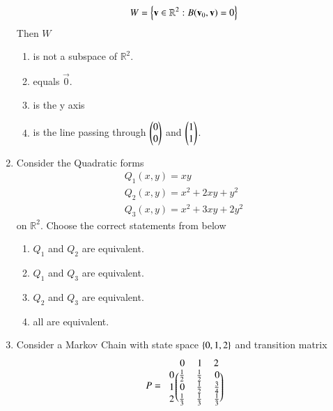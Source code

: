\begin{enumerate}[label=\thesection.\arabic*.,ref=\thesection.\theenumi]
\begin{align}
W = \left\{\mathbf{v} \in \mathbb{R}^2: B(\mathbf{v}_0,\mathbf{v}) =0\right\}
\end{align}
Then $W$
\begin{enumerate}
\item is not a subspace of $\mathbb{R}^2$.
\item equals $\vec{0}$.
\item is the y axis
\item is the line passing through $\begin{pmatrix}0 \\ 0\end{pmatrix}$ and $\begin{pmatrix}1 \\ 1\end{pmatrix}$.
\end{enumerate}
%
\solution

\item Consider the Quadratic forms
\begin{align}
Q_1(x,y) = xy
\\
Q_2(x,y) = x^2+2xy+y^2
\\
Q_3(x,y) = x^2+3xy+2y^2
\end{align}
%
on $\mathbb{R}^2$.  Choose the correct statements from below
\begin{enumerate}
\item $Q_1$ and $Q_2$ are equivalent.
\item $Q_1$ and $Q_3$ are equivalent.
\item $Q_2$ and $Q_3$ are equivalent.
\item all are equivalent.
\end{enumerate}
\solution

\item Consider a Markov Chain with state space $\left\{0,1,2\right\}$ and transition matrix
\begin{align}
P = 
\begin{blockarray}{c@{\hspace{1pt}}rrr@{\hspace{3pt}}}
         & 0   & 1   & 2 \\
        \begin{block}{r@{\hspace{3pt}}@{\hspace{1pt}}
    (@{\hspace{1pt}}rrr@{\hspace{1pt}}@{\hspace{1pt}})}
        0 & \frac{1}{2} & \frac{1}{2} & 0  \\
        1 & 0 &\frac{1}{2}  & \frac{3}{4}  \\
%
        2 &  \frac{1}{3} & \frac{1}{3} & \frac{1}{3}  \\

\end{block}
\end{blockarray}
\end{align}
\end{enumerate}
